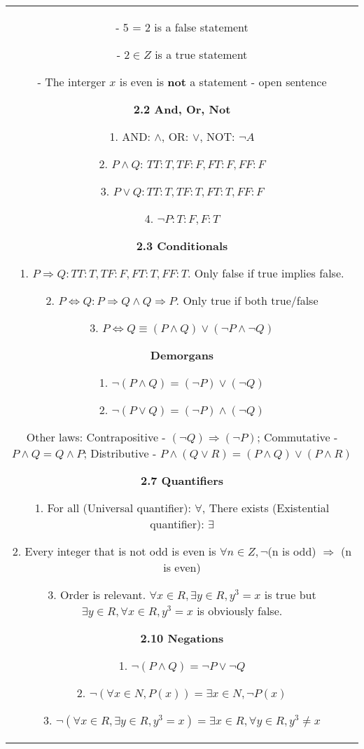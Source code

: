 \documentclass[a4paper]{article}
\begin{document}
\begin{tabular}{@{}c@{}}
\begin{minipage}[t][\paperheight][t]{0.5\paperwidth}
        \quad - 5 = 2 is a false statement

        \quad -  $2 \in Z$ is a true statement

        \quad - The interger $x$ is even is \textbf{not} a statement - open sentence

        \textbf{2.2 And, Or, Not}
        
        1. AND: $\land$, OR: $\lor$, NOT: $\neg A$
        
        2. $P \land Q$:  $TT : T, TF:F, FT:F, FF:F$
        
        3. $P \lor Q: TT:T, TF:T, FT:T, FF:F$ 

        4.  $\neg P: T:F, F:T$

        \textbf{2.3 Conditionals}

        1. $P \Rightarrow Q: TT:T, TF:F, FT:T, FF:T$. Only false if true implies false.


        2. $P \iff Q: P \Rightarrow Q \land Q \Rightarrow P$. Only true if both true/false

        3. $P \iff Q \equiv (P \land Q) \lor(\neg P \land \neg Q)$ 

        \textbf{Demorgans}
        
        1. $\neg (P \land Q) = (\neg P) \lor (\neg Q)$
        
        2. $\neg (P \lor Q) = (\neg P) \land (\neg Q)$

        Other laws: Contrapositive - $(\neg Q) \Rightarrow (\neg P)$; Commutative -  $P \land Q = Q \land P$; Distributive -  $P \land (Q \lor R) = (P \land Q) \lor (P\land R)$

        \textbf{2.7 Quantifiers}

        1. For all (Universal quantifier): $\forall$, There exists (Existential quantifier):  $\exists$

        2. Every integer that is not odd is even is $\forall n \in Z, \neg$(n is odd)  $\Rightarrow$ (n is even)

        3. Order is relevant. $\forall x \in R, \exists y \in R, y^3 = x$ is true but $\exists y \in R, \forall x \in R, y^3 = x $ is obviously false.


        \textbf{2.10 Negations}

        1. $\neg(P \land Q) = \neg P \lor \neg Q$

        2. $\neg(\forall x \in N, P(x)) = \exists x \in N, \neg P(x)$

        3.  $\neg (\forall x \in R, \exists y \in R, y^3 = x) = \exists x \in R, \forall y \in R, y^3 \ne x$




\end{minipage}
\end{tabular}
\end{document}
